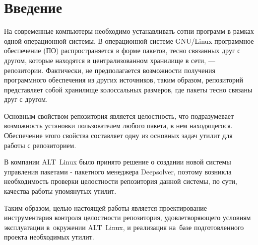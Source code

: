 \section*{Введение}

На современные компьютеры необходимо устанавливать сотни программ в рамках
одной операционной системы. В операционной системе GNU/Linux программное 
обеспечение (ПО) распространяется в форме пакетов, тесно связанных друг с другом,
которые находятся в централизованном хранилище в сети, --- репозитории. 
Фактически, не предполагается возможности получения программного обеспечения из 
других источников, таким образом, репозиторий представляет собой хранилище 
колоссальных размеров, где пакеты тесно связаны друг с другом.

Основным свойством репозитория является целостность, что подразумевает
возможность установки пользователем любого пакета, в нем находящегося. 
Обеспечение этого свойства составляет одну из основных задач утилит для 
работы с репозиторием. 

В компании  ALT~Linux было принято решение о создании новой системы
управления пакетами  - пакетного менеджера Deepsolver, поэтому возникла 
необходимость проверки целостности репозитория данной системы, по сути, 
качества работы упомянутых утилит. 

Таким образом, целью настоящей работы является проектирование 
инструментария контроля целостности репозитория, удовлетворяющего условиям эксплуатации в~окружении ALT~Linux, 
и реализация на~базе подготовленного проекта необходимых утилит.
